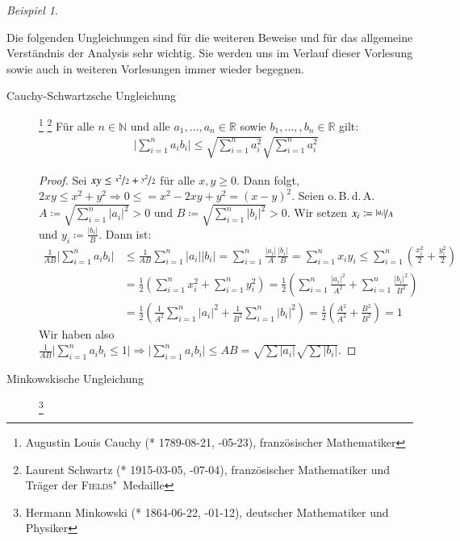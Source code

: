 \documentclass[ngerman,titlepage,twoside, parskip=half*]{scrreprt}
\newcommand*{\N}{\mathbb{N}}
\newcommand*{\R}{\mathbb{R}}
\theoremstyle{plain}
\theoremstyle{definition}
\theoremstyle{remark}
\newtheorem*{beispiel}{Beispiel}
\newcommand*{\abs}[2][]{#1\lvert#2#1\rvert}
\begin{document}
\begin{beispiel}
\begin{enumerate}
\begin{enumerate}[(M1)]
    Die folgenden Ungleichungen sind für die weiteren Beweise und für das
    allgemeine Verständnis der Analysis sehr wichtig. Sie werden uns im
    Verlauf dieser Vorlesung sowie auch in weiteren Vorlesungen immer wieder
    begegnen.
    \begin{description}
    \item[Cauchy-Schwartzsche Ungleichung]\footnote{Augustin Louis Cauchy (*
      1789-08-21, -05-23), französischer Mathematiker}
      \footnote{Laurent Schwartz (* 1915-03-05, -07-04),
	französischer Mathematiker und Träger der \textsc{Fields}"~Medaille}
      Für alle $n\in\N$ und alle $a_1 ,\ldots ,a_n \in \R$ sowie
      $b_{1},\dotsc, ,b_n \in \R$
      gilt:
      \begin{gather*}
	\abs[\bigg]{\sum_{i=1}^n a_i b_i} \leq \sqrt{\sum_{i=1}^n a_i^2}
	   \sqrt{\sum_{i=1}^n a_i^2}
      \end{gather*}
      \begin{proof}
	Sei $xy \leq\nicefrac{x^2}{2}+\nicefrac{y^2}{2}$ für alle $x,y \geq
	0$. Dann folgt, $2xy\leq x^{2}+y^{2}\Rightarrow0 \leq = x^2-2xy+y^2=
	(x-y)^{2}$. Seien o.\,B.\,d.\,A. $A\coloneqq\sqrt{\sum_{i=1}^n
	\abs{a_i}^2}>0$ und $B\coloneqq\sqrt{\sum_{i=1}^n \abs{b_i}^2}>0$. Wir
	setzen $x_i \coloneqq \nicefrac{\abs{a_i}}{A}$ und  $y_i
	\coloneqq\frac{\abs{b_i}}{B}$.  Dann ist:
      \begin{align*}
        \frac{1}{AB}\abs[\bigg]{\sum_{i=1}^n a_i b_i} &\leq
	   \frac{1}{AB}\sum_{i=1}^n \abs{a_i}\abs{b_i} = \sum_{i=1}^n
	   \frac{\abs{a_i}}{A} \frac{\abs{b_i}}{B} = \sum_{i=1}^n x_i y_i
	   \leq \sum_{i=1}^n \left(\frac{x_i^2}{2}+\frac{y_i^2}{2}\right)\\
	&= \frac{1}{2}\left(\sum_{i=1}^n x_i^2 + \sum_{i=1}^n y_i^2\right) =
	   \frac{1}{2} \left( \sum_{i=1}^n \frac{\abs{a_i}^2}{A^2} +
	   \sum_{i=1}^n \frac{\abs{b_i}^2}{B^2}\right)\\
        & = \frac{1}{2} \left( \frac{1}{A^2} \sum_{i=1}^n \abs{a_i}^2 +
	   \frac{1}{B^2} \sum_{i=1}^n \abs{b_i}^2\right) = \frac{1}{2} \left(
	   \frac{A^2}{A^2} + \frac{B^2}{B^2} \right)  = 1
      \end{align*}
	Wir haben also $\frac{1}{AB}\abs{\sum_{i=1}^{n} a_{i}
	b_{i}\leq1}\Rightarrow \abs{\sum_{i=1}^{n}a_{i} b_{i}}\leq AB=
	\sqrt{\sum\abs{a_{i}}} \sqrt{\sum\abs{b_{i}}}$.
      \end{proof}
    \item[Minkowskische Ungleichung]\footnote{Hermann Minkowski (* 1864-06-22, -01-12), deutscher Mathematiker und Physiker}

\end{description}
\end{enumerate}
\end{enumerate}
\end{beispiel}
\end{document}

